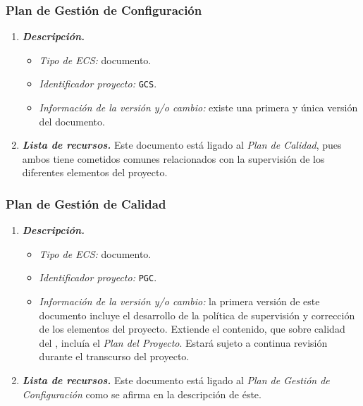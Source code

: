 \documentclass[11pt, a4paper, twoside, titlepage]{article}
\begin{document}
			\subsubsection{Plan de Gestión de Configuración}
			\begin{enumerate}
				\item {\itshape \bfseries Descripción.}
						\begin{itemize}
							\item \textit{Tipo de ECS:} documento.
							\item \textit{Identificador proyecto:} \verb|GCS|.
							\item \textit{Información de la versión y/o cambio:} existe una primera y única versión del documento.
						\end{itemize}

					\item {\itshape \bfseries Lista de recursos.}
						Este documento está ligado al \textit{Plan de Calidad}, pues ambos tiene cometidos comunes relacionados con la supervisión de los diferentes elementos del proyecto.
				\end{enumerate}

			\subsubsection{Plan de Gestión de Calidad}
			\begin{enumerate}
				\item {\itshape \bfseries Descripción.}
						\begin{itemize}
							\item \textit{Tipo de ECS:} documento.
							\item \textit{Identificador proyecto:} \verb|PGC|.
							\item \textit{Información de la versión y/o cambio:} la primera versión de este documento incluye el desarrollo de la política de supervisión y corrección de los elementos del proyecto. Extiende el contenido, que sobre calidad del \software, incluía el {\itshape Plan del Proyecto}. Estará sujeto a continua revisión durante el transcurso del proyecto.
						\end{itemize}

					\item {\itshape \bfseries Lista de recursos.}
						Este documento está ligado al \textit{Plan de Gestión de Configuración} como se afirma en la descripción de éste.
				\end{enumerate}
\end{document}
